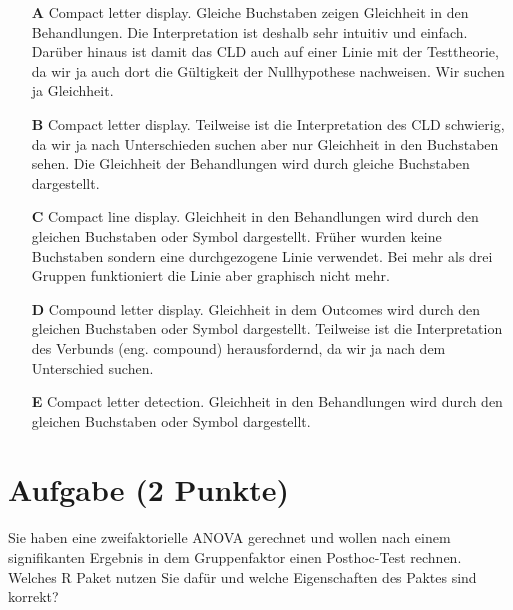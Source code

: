 \documentclass[a4paper, 9pt]{scrartcl}\usepackage[]{graphicx}\usepackage[]{xcolor}
\begin{document}
\begin{enumerate}
\item [\textbf{A} \msquare] Compact letter display. Gleiche Buchstaben zeigen Gleichheit in den Behandlungen. Die Interpretation ist deshalb sehr intuitiv und einfach. Darüber hinaus ist damit das CLD auch auf einer Linie mit der Testtheorie, da wir ja auch dort die Gültigkeit der Nullhypothese nachweisen. Wir suchen ja Gleichheit.
\item [\textbf{B} \msquare] Compact letter display. Teilweise ist die Interpretation des CLD schwierig, da wir ja nach Unterschieden suchen aber nur Gleichheit in den Buchstaben sehen. Die Gleichheit der Behandlungen wird durch gleiche Buchstaben dargestellt.
\item [\textbf{C} \msquare] Compact line display. Gleichheit in den Behandlungen wird durch den gleichen Buchstaben oder Symbol dargestellt. Früher wurden keine Buchstaben sondern eine durchgezogene Linie verwendet. Bei mehr als drei Gruppen funktioniert die Linie aber graphisch nicht mehr.
\item [\textbf{D} \msquare] Compound letter display. Gleichheit in dem Outcomes wird durch den gleichen Buchstaben oder Symbol dargestellt. Teilweise ist die Interpretation des Verbunds (eng. compound) herausfordernd, da wir ja nach dem Unterschied suchen.
\item [\textbf{E} \msquare] Compact letter detection. Gleichheit in den Behandlungen wird durch den gleichen Buchstaben oder Symbol dargestellt.
\end{enumerate}

\section{Aufgabe \hfill (2 Punkte)}




Sie haben eine zweifaktorielle ANOVA gerechnet und wollen nach einem signifikanten Ergebnis in dem Gruppenfaktor einen Posthoc-Test rechnen. Welches R Paket nutzen Sie dafür und welche Eigenschaften des Paktes sind korrekt?
\end{document}
